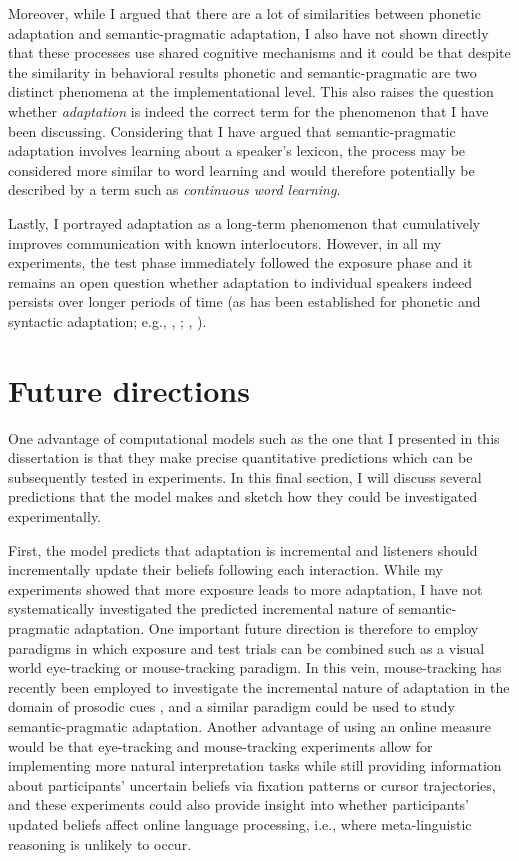 Moreover, while I argued that there are a lot of similarities between phonetic adaptation and semantic-pragmatic adaptation, I also have not shown directly
that these processes use shared cognitive mechanisms and it could be that despite the similarity in behavioral results phonetic and semantic-pragmatic
are two distinct phenomena at the implementational level. This also raises the question whether \textit{adaptation} is indeed the correct term
for the phenomenon that I have been discussing. Considering that I have argued that semantic-pragmatic adaptation involves learning about a speaker's
lexicon, the process may be considered more similar to word learning and would therefore potentially be described by a term such as \textit{continuous word learning}. 

Lastly, I portrayed adaptation as a long-term phenomenon that cumulatively improves communication with known interlocutors.
However, in all my experiments, the test phase immediately followed the exposure phase and it remains an open question
whether adaptation to individual speakers indeed persists over longer periods of time (as has been established for phonetic and syntactic
adaptation; e.g., \citeauthor{Xie2018}, \citeyear{Xie2018}; \citeauthor{Kroczek2017}, \citeyear{Kroczek2017}).

\section{Future directions}

One advantage of computational models such as the one that I presented in this dissertation is that they make precise quantitative predictions which can
be subsequently tested in experiments. In this final section, I will discuss several predictions that the model makes and sketch how they could be investigated experimentally.

First, the model predicts that adaptation is incremental and listeners should incrementally update their beliefs following each interaction. While my experiments showed that more exposure leads to more adaptation, I have not systematically investigated the predicted incremental nature of semantic-pragmatic adaptation. One important future direction is therefore to employ paradigms in which exposure and test trials can be combined such as a visual world eye-tracking or mouse-tracking paradigm.  In this vein, mouse-tracking has recently been
employed  to investigate the incremental nature of adaptation in the domain of  prosodic cues \cite{Roettger2019}, and a similar paradigm could be used to study semantic-pragmatic adaptation. Another advantage of using an online measure would be that eye-tracking and mouse-tracking experiments allow for 
implementing more natural interpretation tasks while still providing information about participants' uncertain beliefs via fixation patterns or cursor trajectories,
and these experiments could also provide insight into whether participants' updated beliefs affect online language processing, i.e., where meta-linguistic reasoning is unlikely to occur.


